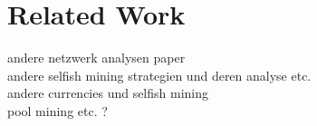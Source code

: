 \chapter{Related Work}\label{chap:relatedwork}
andere netzwerk analysen paper\\
andere selfish mining strategien und deren analyse etc.\\
andere currencies und selfish mining\\ 
pool mining etc. ?\\